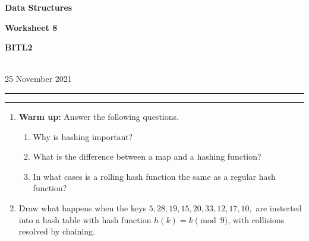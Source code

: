 \documentclass[a4paper,12pt]{article}
\begin{document}
\begin{center}
\parbox{3.5cm}{\textbf{Data Structures}} \hfill {\bf\Huge Worksheet 8} \hfill \parbox{3.5cm}{\flushright\textbf{BITL2}} \\[5pt]
\rm\small 25 November 2021
\end{center}

\hrule\vspace{2pt}\hrule

\begin{enumerate}

\item \textbf{Warm up:} Answer the following questions.
\begin{enumerate}
\item Why is hashing important?
\item What is the difference between a map and a hashing function?
\item In what cases is a rolling hash function the same as a regular hash function? 
\end{enumerate}

\vfill
\item Draw what happens when the keys $5, 28, 19, 15, 20, 33, 12, 17, 10,$ are insterted into a hash table with hash function $h(k) = k\pmod 9$, with collisions resolved by chaining. 



\end{enumerate}
\end{document}
